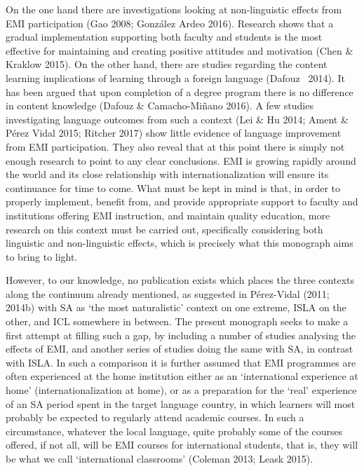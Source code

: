 \documentclass[12pt]{article}
\newenvironment{styleStandard}{\setlength\leftskip{0cm}\setlength\rightskip{0cm plus 1fil}\setlength\parindent{0cm}\setlength\parfillskip{0pt plus 1fil}\setlength\parskip{0in plus 1pt}\writerlistparindent\writerlistleftskip\leavevmode\normalfont\normalsize\writerlistlabel\ignorespaces}{\unskip\vspace{0.111in plus 0.0111in}\par}
\newcommand\writerlistleftskip{}
\newcommand\writerlistparindent{}
\newcommand\writerlistlabel{}
\begin{document}
\begin{styleStandard}
On the one hand there are investigations looking at non-linguistic effects from EMI participation (Gao 2008; González Ardeo 2016). Research shows that a gradual implementation supporting both faculty and students is the most effective for maintaining and creating positive attitudes and motivation (Chen \& Kraklow 2015). On the other hand, there are studies regarding the content learning implications of learning through a foreign language (Dafouz \ 2014). It has been argued that upon completion of a degree program there is no difference in content knowledge (Dafouz \& Camacho-Miñano 2016). A few studies investigating language outcomes from such a context (Lei \& Hu 2014; Ament \& Pérez Vidal 2015; Ritcher 2017) show little evidence of language improvement from EMI participation. They also reveal that at this point there is simply not enough research to point to any clear conclusions. EMI is growing rapidly around the world and its close relationship with internationalization will ensure its continuance for time to come. What must be kept in mind is that, in order to properly implement, benefit from, and provide appropriate support to faculty and institutions offering EMI instruction, and maintain quality education, more research on this context must be carried out, specifically considering both linguistic and non-linguistic effects, which is precisely what this monograph aims to bring to light. 
\end{styleStandard}

\begin{styleStandard}
However, to our knowledge, no publication exists which places the three contexts along the continuum already mentioned, as suggested in Pérez-Vidal (2011; 2014b) with SA as ‘the most naturalistic’ context on one extreme, ISLA on the other, and ICL somewhere in between. The present monograph seeks to make a first attempt at filling such a gap, by including a number of studies analysing the effects of EMI, and another series of studies doing the same with SA, in contrast with ISLA. In such a comparison it is further assumed that EMI programmes are often experienced at the home institution either as an ‘international experience at home’ (internationalization at home), or as a preparation for the ‘real’ experience of an SA period spent in the target language country, in which learners will most probably be expected to regularly attend academic courses. In such a circumstance, whatever the local language, quite probably some of the courses offered, if not all, will be EMI courses for international students, that is, they will be what we call ‘international classrooms’ (Coleman 2013; Leask 2015). 
\end{styleStandard}
\end{document}
